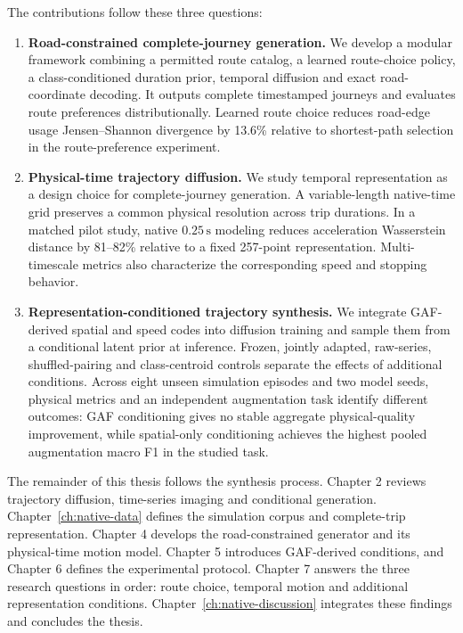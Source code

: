 The contributions follow these three questions:
\begin{enumerate}
    \item \textbf{Road-constrained complete-journey generation.} We develop a modular framework combining a permitted route catalog, a learned route-choice policy, a class-conditioned duration prior, temporal diffusion and exact road-coordinate decoding. It outputs complete timestamped journeys and evaluates route preferences distributionally. Learned route choice reduces road-edge usage Jensen--Shannon divergence by 13.6\% relative to shortest-path selection in the route-preference experiment.
    \item \textbf{Physical-time trajectory diffusion.} We study temporal representation as a design choice for complete-journey generation. A variable-length native-time grid preserves a common physical resolution across trip durations. In a matched pilot study, native $0.25\,\text{s}$ modeling reduces acceleration Wasserstein distance by 81--82\% relative to a fixed 257-point representation. Multi-timescale metrics also characterize the corresponding speed and stopping behavior.
    \item \textbf{Representation-conditioned trajectory synthesis.} We integrate GAF-derived spatial and speed codes into diffusion training and sample them from a conditional latent prior at inference. Frozen, jointly adapted, raw-series, shuffled-pairing and class-centroid controls separate the effects of additional conditions. Across eight unseen simulation episodes and two model seeds, physical metrics and an independent augmentation task identify different outcomes: GAF conditioning gives no stable aggregate physical-quality improvement, while spatial-only conditioning achieves the highest pooled augmentation macro F1 in the studied task.
\end{enumerate}

The remainder of this thesis follows the synthesis process. Chapter 2 reviews trajectory diffusion, time-series imaging and conditional generation. Chapter~\ref{ch:native-data} defines the simulation corpus and complete-trip representation. Chapter 4 develops the road-constrained generator and its physical-time motion model. Chapter 5 introduces GAF-derived conditions, and Chapter 6 defines the experimental protocol. Chapter 7 answers the three research questions in order: route choice, temporal motion and additional representation conditions. Chapter~\ref{ch:native-discussion} integrates these findings and concludes the thesis.
